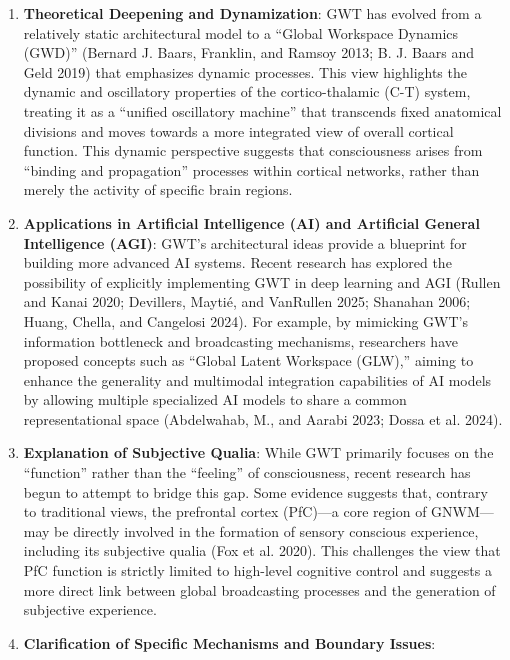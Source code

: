 \documentclass[
  a4paper]{article}
\begin{document}
\begin{enumerate}
\def\labelenumi{\arabic{enumi}.}
\item
  \textbf{Theoretical Deepening and Dynamization}: GWT has evolved from
  a relatively static architectural model to a ``Global Workspace
  Dynamics (GWD)'' (Bernard J. Baars, Franklin, and Ramsoy 2013; B. J.
  Baars and Geld 2019) that emphasizes dynamic processes. This view
  highlights the dynamic and oscillatory properties of the
  cortico-thalamic (C-T) system, treating it as a ``unified oscillatory
  machine'' that transcends fixed anatomical divisions and moves towards
  a more integrated view of overall cortical function. This dynamic
  perspective suggests that consciousness arises from ``binding and
  propagation'' processes within cortical networks, rather than merely
  the activity of specific brain regions.
\item
  \textbf{Applications in Artificial Intelligence (AI) and Artificial
  General Intelligence (AGI)}: GWT's architectural ideas provide a
  blueprint for building more advanced AI systems. Recent research has
  explored the possibility of explicitly implementing GWT in deep
  learning and AGI (Rullen and Kanai 2020; Devillers, Maytié, and
  VanRullen 2025; Shanahan 2006; Huang, Chella, and Cangelosi 2024). For
  example, by mimicking GWT's information bottleneck and broadcasting
  mechanisms, researchers have proposed concepts such as ``Global Latent
  Workspace (GLW),'' aiming to enhance the generality and multimodal
  integration capabilities of AI models by allowing multiple specialized
  AI models to share a common representational space (Abdelwahab, M.,
  and Aarabi 2023; Dossa et al. 2024).
\item
  \textbf{Explanation of Subjective Qualia}: While GWT primarily focuses
  on the ``function'' rather than the ``feeling'' of consciousness,
  recent research has begun to attempt to bridge this gap. Some evidence
  suggests that, contrary to traditional views, the prefrontal cortex
  (PfC)---a core region of GNWM---may be directly involved in the
  formation of sensory conscious experience, including its subjective
  qualia (Fox et al. 2020). This challenges the view that PfC function
  is strictly limited to high-level cognitive control and suggests a
  more direct link between global broadcasting processes and the
  generation of subjective experience.
\item
  \textbf{Clarification of Specific Mechanisms and Boundary Issues}:


\end{enumerate}
\end{document}
